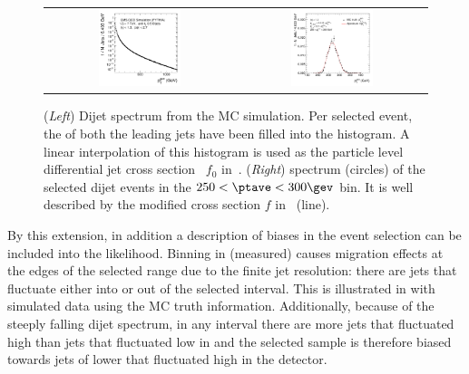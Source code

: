 \begin{figure}[ht]
 \centering
  \begin{tabular}{cc}
    \includegraphics[width=0.45\textwidth]{figures/ExampleSpectrum} &
    \includegraphics[width=0.45\textwidth]{figures/MaxLike_Eta00-13_SpectrumJet1_PtBin7}\\
 \end{tabular}
  \caption{(\textit{Left}) Dijet \ptgen spectrum from the MC simulation.
    Per selected event, the \ptgen of both the leading jets have been filled into the histogram.
    A linear interpolation of this histogram is used as the particle
    level differential jet cross section~ $f_{0}$ in~.
    (\textit{Right}) \ptgen spectrum (circles) of the selected dijet events in the \mbox{$250 < \ptave < 300\gev$} bin.
    It is well described by the modified cross section $f$ in~ (line).}
  \label{fig:ResFit:DataDriven:Spectrum}
\end{figure}

By this extension, in addition a description of biases in the event selection can be included into the likelihood.
Binning in (measured) \ptave causes migration effects at the edges of the selected \ptave range due to the finite jet \pt resolution:
there are jets that fluctuate either into or out of the selected interval.
This is illustrated in  with simulated data using the MC truth information.
Additionally, because of the steeply falling dijet \pt spectrum, in
any interval there are more jets that fluctuated high than jets that fluctuated low in \pt and the selected sample is therefore biased towards jets of lower \ptgen that fluctuated high in the detector.

